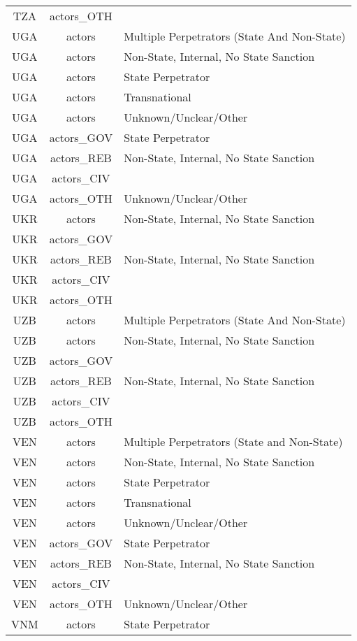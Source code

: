 \documentclass[12pt]{article}
\begin{document}
\begin{center}
\begin{longtable}{|c|c|p{10cm}|}
  TZA & actors\_OTH &  \\ 
  UGA & actors & Multiple Perpetrators (State And Non-State) \\ 
  UGA & actors & Non-State, Internal, No State Sanction \\ 
  UGA & actors & State Perpetrator \\ 
  UGA & actors & Transnational \\ 
  UGA & actors & Unknown/Unclear/Other \\ 
  UGA & actors\_GOV & State Perpetrator \\ 
  UGA & actors\_REB & Non-State, Internal, No State Sanction \\ 
  UGA & actors\_CIV &  \\ 
  UGA & actors\_OTH & Unknown/Unclear/Other \\ 
  UKR & actors & Non-State, Internal, No State Sanction \\ 
  UKR & actors\_GOV &  \\ 
  UKR & actors\_REB & Non-State, Internal, No State Sanction \\ 
  UKR & actors\_CIV &  \\ 
  UKR & actors\_OTH &  \\ 
  UZB & actors & Multiple Perpetrators (State And Non-State) \\ 
  UZB & actors & Non-State, Internal, No State Sanction \\ 
  UZB & actors\_GOV &  \\ 
  UZB & actors\_REB & Non-State, Internal, No State Sanction \\ 
  UZB & actors\_CIV &  \\ 
  UZB & actors\_OTH &  \\ 
  VEN & actors & Multiple Perpetrators (State and Non-State) \\ 
  VEN & actors & Non-State, Internal, No State Sanction \\ 
  VEN & actors & State Perpetrator \\ 
  VEN & actors & Transnational \\ 
  VEN & actors & Unknown/Unclear/Other \\ 
  VEN & actors\_GOV & State Perpetrator \\ 
  VEN & actors\_REB & Non-State, Internal, No State Sanction \\ 
  VEN & actors\_CIV &  \\ 
  VEN & actors\_OTH & Unknown/Unclear/Other \\ 
  VNM & actors & State Perpetrator \\ 

\end{longtable}
\end{center}
\end{document}
